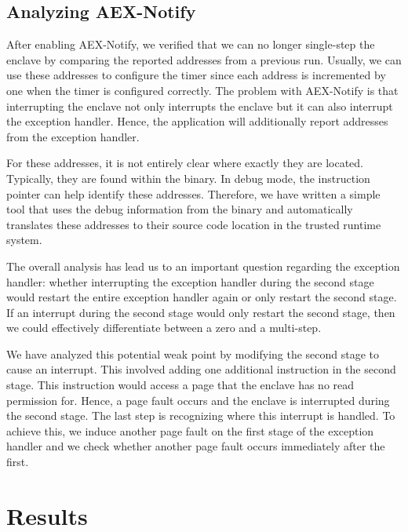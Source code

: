 \documentclass{llncs}
\begin{document}
\subsection{Analyzing AEX-Notify}

After enabling AEX-Notify, we verified that we can no longer single-step the enclave
by comparing the reported addresses from a previous run.
Usually, we can use these addresses to configure the timer
since each address is incremented by one when the timer is configured correctly.
The problem with AEX-Notify is that interrupting the enclave not only
interrupts the enclave but it can also interrupt the exception handler.
Hence, the application will additionally report addresses from the exception handler.

For these addresses, it is not entirely clear where exactly they are located. Typically, they are found within the binary. In debug mode, the instruction pointer can help identify these addresses.
Therefore, we have written a simple tool that uses the debug information from the binary and
automatically translates these addresses to their source code location in the trusted runtime system.


The overall analysis has lead us to an important question regarding the exception handler:
whether interrupting the exception handler during the second stage would
restart the entire exception handler again or only restart the second stage.
If an interrupt during the second stage would only restart the second stage,
then we could effectively differentiate between a zero and a multi-step.

We have analyzed this potential weak point by modifying the second stage to cause an interrupt.
This involved adding one additional instruction in the second stage.
This instruction would access a page that the enclave has no read permission for.
Hence, a page fault occurs and the enclave is interrupted during the second stage.
The last step is recognizing where this interrupt is handled.
To achieve this, we induce another page fault on the first stage of the exception handler
and we check whether another page fault occurs immediately after the first.

\section{Results}
\end{document}
